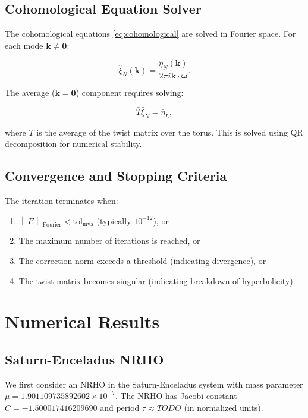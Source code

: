\documentclass[review,onefignum,onetabnum]{siamart220329}
\newcommand{\norm}[1]{\left\|#1\right\|}
\begin{document}
\subsection{Cohomological Equation Solver}

The cohomological equations \eqref{eq:cohomological} are solved in Fourier space.
For each mode $\mathbf{k} \neq \mathbf{0}$:

\begin{equation}
\hat{\xi}_N(\mathbf{k}) = \frac{\hat{\eta}_N(\mathbf{k})}{2\pi i \mathbf{k} \cdot \boldsymbol{\omega}}.
\end{equation}

The average ($\mathbf{k} = \mathbf{0}$) component requires solving:

\begin{equation}
\bar{T} \bar{\xi}_N = \bar{\eta}_L,
\end{equation}

where $\bar{T}$ is the average of the twist matrix over the torus. This is solved
using QR decomposition for numerical stability.

\subsection{Convergence and Stopping Criteria}

The iteration terminates when:
\begin{enumerate}
    \item $\norm{E}_{\text{Fourier}} < \text{tol}_{\text{inva}}$
          (typically $10^{-12}$), or
    \item The maximum number of iterations is reached, or
    \item The correction norm exceeds a threshold (indicating divergence), or
    \item The twist matrix becomes singular (indicating breakdown of hyperbolicity).
\end{enumerate}

\section{Numerical Results}
\label{sec:results}

\subsection{Saturn-Enceladus NRHO}

We first consider an NRHO in the Saturn-Enceladus system with mass parameter
$\mu = 1.901109735892602 \times 10^{-7}$. The NRHO has Jacobi constant
$C = -1.500017416209690$ and period $\tau \approx TODO$ (in normalized units).
\end{document}
